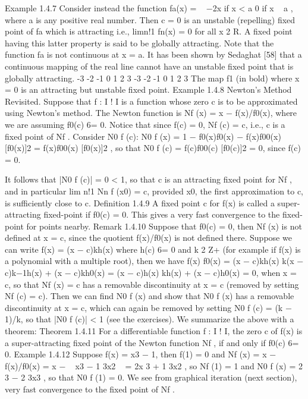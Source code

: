 \documentclass[12pt]{article}
\begin{document}
\begin{enumerate}
\begin{enumerate}
Example 1.4.7 Consider instead the function fa(x) =
 
−2x if x < a
0 if x   a
, where
a is any positive real number. Then c = 0 is an unstable (repelling) fixed point of
fa which is attracting i.e., limn!1 fn(x) = 0 for all x 2 R. A fixed point having
this latter property is said to be globally attracting. Note that the function fa is not
continuous at x = a. It has been shown by Sedaghat [58] that a continuous mapping
of the real line cannot have an unstable fixed point that is globally attracting.
-3 -2 -1 0 1 2 3
-3
-2
-1
0
1
2
3
The map f1 (in bold) where x = 0 is an attracting but unstable fixed point.
Example 1.4.8 Newton’s Method Revisited.
Suppose that f : I ! I is a function whose zero c is to be approximated using
Newton’s method. The Newton function is Nf (x) = x − f(x)/f0(x), where we are
assuming f0(c) 6= 0. Notice that since f(c) = 0, Nf (c) = c, i.e., c is a fixed point of
Nf . Consider N0
f (c):
N0
f (x) = 1 −
f0(x)f0(x) − f(x)f00(x)
[f0(x)]2 =
f(x)f00(x)
[f0(x)]2 ,
so that
N0
f (c) =
f(c)f00(c)
[f0(c)]2 = 0,
since f(c) = 0.

It follows that |N0
f (c)| = 0 < 1, so that c is an attracting fixed point for Nf , and
in particular
lim
n!1
Nn
f (x0) = c,
provided x0, the first approximation to c, is sufficiently close to c.
Definition 1.4.9 A fixed point c for f(x) is called a super-attracting fixed-point if
f0(c) = 0. This gives a very fast convergence to the fixed-point for points nearby.
Remark 1.4.10 Suppose that f0(c) = 0, then Nf (x) is not defined at x = c, since the
quotient f(x)/f0(x) is not defined there. Suppose we can write f(x) = (x − c)kh(x)
where h(c) 6= 0 and k 2 Z+ (for example if f(x) is a polynomial with a multiple root),
then we have
f(x)
f0(x)
=
(x − c)kh(x)
k(x − c)k−1h(x) + (x − c)kh0(x)
=
(x − c)h(x)
kh(x) + (x − c)h0(x)
= 0,
when x = c, so that Nf (x) = c has a removable discontinuity at x = c (removed by
setting Nf (c) = c). Then we can find N0
f (x) and show that N0
f (x) has a removable
discontinuity at x = c, which can again be removed by setting N0
f (c) = (k − 1)/k, so
that |N0
f (c)| < 1 (see the exercises).
We summarize the above with a theorem:
Theorem 1.4.11 For a differentiable function f : I ! I, the zero c of f(x) is a
super-attracting fixed point of the Newton function Nf , if and only if f0(c) 6= 0.
Example 1.4.12 Suppose f(x) = x3 − 1, then f(1) = 0 and
Nf (x) = x − f(x)/f0(x) = x −
 
x3 − 1
3x2
 
=
2x
3
+
1
3x2 ,
so Nf (1) = 1 and N0
f (x) = 2
3
− 2
3x3 , so that N0
f (1) = 0. We see from graphical iteration
(next section), very fast convergence to the fixed point of Nf .


\end{enumerate}
\end{enumerate}
\end{document}
